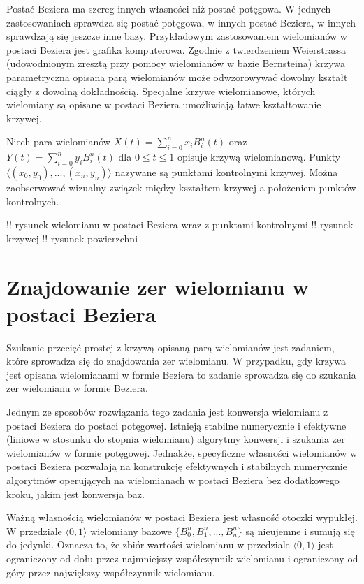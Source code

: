 \documentclass{article}
\begin{document}
Postać Beziera ma szereg innych własności niż postać potęgowa. W jednych zastosowaniach sprawdza się postać potęgowa, w innych postać Beziera, w innych sprawdzają się jeszcze inne bazy. Przykładowym zastosowaniem wielomianów w postaci Beziera jest grafika komputerowa. Zgodnie z twierdzeniem Weierstrassa (udowodnionym zresztą przy pomocy wielomianów w bazie Bernsteina) krzywa parametryczna opisana parą wielomianów może odwzorowywać dowolny kształt ciągły z dowolną dokładnością. Specjalne krzywe wielomianowe, których wielomiany są opisane w postaci Beziera umożliwiają łatwe kształtowanie krzywej.

Niech para wielomianów $X(t) = \sum^n_{i=0}x_i B^n_i(t)$ oraz $Y(t) = \sum^n_{i=0}y_i B^n_i(t)$ dla $0\leq t \leq 1$ opisuje krzywą wielomianową. Punkty $\langle (x_0,y_0), ..., (x_n, y_n) \rangle$ nazywane są punktami kontrolnymi krzywej. Można zaobserwować wizualny związek między kształtem krzywej a położeniem punktów kontrolnych.

!! rysunek wielomianu w postaci Beziera wraz z punktami kontrolnymi
!! rysunek krzywej
!! rysunek powierzchni

\section{Znajdowanie zer wielomianu w postaci Beziera}

Szukanie przecięć prostej z krzywą opisaną parą wielomianów jest zadaniem, które sprowadza się do znajdowania zer wielomianu. W przypadku, gdy krzywa jest opisana wielomianami w formie Beziera to zadanie sprowadza się do szukania zer wielomianu w formie Beziera.

Jednym ze sposobów rozwiązania tego zadania jest konwersja wielomianu z postaci Beziera do postaci potęgowej. Istnieją stabilne numerycznie i efektywne (liniowe w stosunku do stopnia wielomianu) algorytmy konwersji i szukania zer wielomianów w formie potęgowej. Jednakże, specyficzne własności wielomianów w postaci Beziera pozwalają na konstrukcję efektywnych i stabilnych numerycznie algorytmów operujących na wielomianach w postaci Beziera bez dodatkowego kroku, jakim jest konwersja baz.

Ważną własnością wielomianów w postaci Beziera jest własność otoczki wypukłej. W przedziale $\langle 0, 1 \rangle$ wielomiany bazowe $\{ B^n_0, B^n_1, ..., B^n_n \}$ są nieujemne i sumują się do jedynki. Oznacza to, że zbiór wartości wielomianu w przedziale $\langle 0, 1 \rangle$ jest ograniczony od dołu przez najmniejszy współczynnik wielomianu i ograniczony od góry przez największy współczynnik wielomianu.
\end{document}
